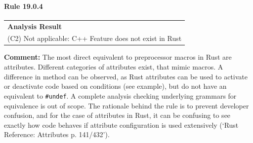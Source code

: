 \paragraph{Rule 19.0.4}
\begin{longtable}{p{13cm}}
\textbf{Analysis Result} \\
(C2) Not applicable: C++ Feature does not exist in Rust \\
\end{longtable}
\textbf{Comment:} The most direct equivalent to preprocessor macros in Rust are attributes. Different categories of attributes exist, that mimic \Cpp macros. A difference in method can be observed, as Rust attributes can be used to activate or deactivate code based on conditions (see example), but do not have an equivalent to \texttt{\#undef}. A complete analysis checking underlying grammars for equivalence is out of scope. The rationale behind the rule is to prevent developer confusion, and for the case of attributes in Rust, it can be confusing to see exactly how code behaves if attribute configuration is used extensively (`Rust Reference: Attributes p. 141/432'). \\
